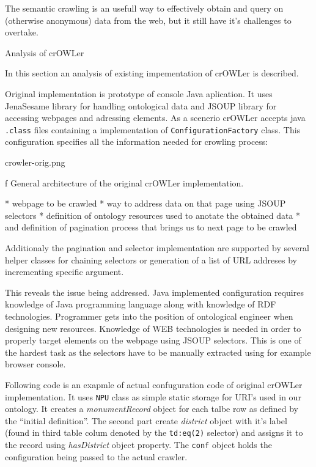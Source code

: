 The semantic crawling is an usefull way to effectively obtain and query on
(otherwise anonymous) data from the web, but it still have it's challenges to
overtake. 


\sec Analysis of crOWLer

In this section an analysis of existing impementation of crOWLer is described. 

Original implementation is prototype of console Java aplication. It uses
JenaSesame library for handling ontological data and JSOUP library for
accessing webpages and adressing elements. As a scenerio crOWLer accepts java
{\tt .class} files containing a implementation of {\tt ConfigurationFactory}
class. This configuration specifies all the information needed for crowling
process: 

\midinsert
\picw=10cm \cinspic crowler-orig.png
\caption/f General architecture of the original crOWLer implementation. 
\endinsert

\begitems
  * webpage to be crawled
  * way to address data on that page using JSOUP selectors
  * definition of ontology resources used to anotate the obtained data
  * and definition of pagination process that brings us to next page to be crawled
\enditems

Additionaly the pagination and selector implementation are supported by several
helper classes for chaining selectors or generation of a list of URL addreses
by incrementing specific argument. 

This reveals the issue being addressed. Java implemented configuration requires
knowledge of Java programming language along with knowledge of RDF
technologies. Programmer gets into the position of ontological engineer when
designing new resources. Knowledge of WEB technologies is needed in order to
properly target elements on the webpage using JSOUP selectors. This is one of
the hardest task as the selectors have to be manually extracted using for
example browser console. 

Following code is an exapmle of actual confuguration code of original crOWLer
implementation.  It uses {\tt NPU} class as simple static storage for URI's
used in our ontology. It creates a {\em monumentRecord} object for each talbe
row as defined by the ``initial definition''. The second part create {\em
district} object with it's label (found in third table colum denoted by the
{\tt td:eq(2)} selector) and assigns it to the record using {\em hasDistrict}
object property. The {\tt conf} object holds the configuration being passed to
the actual crawler. 

